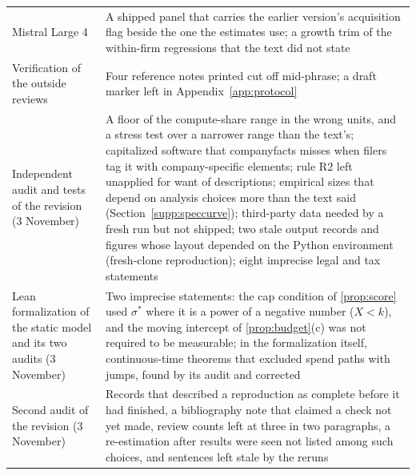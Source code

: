 {\begin{longtable}{@{}p{}p{}@{}}
Mistral Large 4 & A shipped panel that carries the earlier version's acquisition flag beside the one the estimates use; a growth trim of the within-firm regressions that the text did not state\\
Verification of the outside reviews & Four reference notes printed cut off mid-phrase; a draft marker left in Appendix~\ref{app:protocol}\\
Independent audit and tests of the revision (3 November) & A floor of the compute-share range in the wrong units, and a stress test over a narrower range than the text's; capitalized software that companyfacts misses when filers tag it with company-specific elements; rule R2 left unapplied for want of descriptions; empirical sizes that depend on analysis choices more than the text said (Section~\ref{supp:speccurve}); third-party data needed by a fresh run but not shipped; two stale output records and figures whose layout depended on the Python environment (fresh-clone reproduction); eight imprecise legal and tax statements\\
Lean formalization of the static model and its two audits (3 November) & Two imprecise statements: the cap condition of \autoref{prop:score} used $\sigma^*$ where it is a power of a negative number ($X<k$), and the moving intercept of \autoref{prop:budget}(c) was not required to be measurable; in the formalization itself, continuous-time theorems that excluded spend paths with jumps, found by its audit and corrected\\
Second audit of the revision (3 November) & Records that described a reproduction as complete before it had finished, a bibliography note that claimed a check not yet made, review counts left at three in two paragraphs, a re-estimation after results were seen not listed among such choices, and sentences left stale by the reruns\\
\end{longtable}
}
